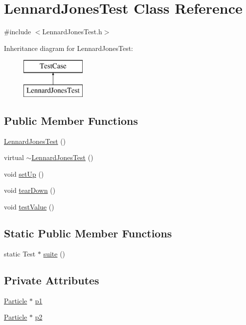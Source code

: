 \hypertarget{classLennardJonesTest}{\section{Lennard\+Jones\+Test Class Reference}
\label{classLennardJonesTest}
}


{\ttfamily \#include $<$Lennard\+Jones\+Test.\+h$>$}

Inheritance diagram for Lennard\+Jones\+Test\+:\begin{figure}[H]
\begin{center}
\leavevmode
\includegraphics[height=2.000000cm]{classLennardJonesTest}
\end{center}
\end{figure}
\subsection*{Public Member Functions}
\begin{DoxyCompactItemize}
\item 
\hyperlink{classLennardJonesTest_a51c8fec25e8d6ac8097d8daedb2bfe14}{Lennard\+Jones\+Test} ()
\item 
virtual \hyperlink{classLennardJonesTest_a40cd7ff2f8b4cb265010b5416b2d45fd}{$\sim$\+Lennard\+Jones\+Test} ()
\item 
void \hyperlink{classLennardJonesTest_a9b7a2eb583a615878bb44c2be9aa87c9}{set\+Up} ()
\item 
void \hyperlink{classLennardJonesTest_a95821752d5f0bcfb06ab78227a10444c}{tear\+Down} ()
\item 
void \hyperlink{classLennardJonesTest_aa73e875411b6fbd4ca69210c545016f6}{test\+Value} ()
\end{DoxyCompactItemize}
\subsection*{Static Public Member Functions}
\begin{DoxyCompactItemize}
\item 
static Test $\ast$ \hyperlink{classLennardJonesTest_aad533812e025380c46b38b2aeee9010c}{suite} ()
\end{DoxyCompactItemize}
\subsection*{Private Attributes}
\begin{DoxyCompactItemize}
\item 
\hyperlink{classParticle}{Particle} $\ast$ \hyperlink{classLennardJonesTest_a1dc7b555324d73210a031ff3d672c366}{p1}
\item 
\hyperlink{classParticle}{Particle} $\ast$ \hyperlink{classLennardJonesTest_a3e7c82c522e5ef22eaa5cd0efb7866a8}{p2}
\end{DoxyCompactItemize}


